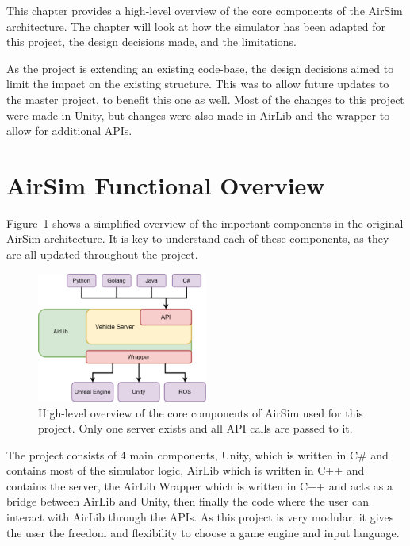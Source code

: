 This chapter provides a high-level overview of the core components of the AirSim architecture. The chapter will look at how the simulator has been adapted for this project, the design decisions made, and the limitations. 

As the project is extending an existing code-base, the design decisions aimed to limit the impact on the existing structure. This was to allow future updates to the master project, to benefit this one as well. Most of the changes to this project were made in Unity, but changes were also made in AirLib and the wrapper to allow for additional APIs. 

\section{AirSim Functional Overview} \label{05:Overview}
Figure~\ref{ADA:Figure:OriginalOverview} shows a simplified overview of the important components in the original AirSim architecture. It is key to understand each of these components, as they are all updated throughout the project. 

\begin{figure}[h]
    \centering
    \includegraphics[width=0.5\textwidth]{05_AnalysisAndDesign/Diagrams/OriginalOverview.png}
    \caption[High-level overview of AirSim]{High-level overview of the core components of AirSim used for this project. Only one server exists and all API calls are passed to it.}
    \label{ADA:Figure:OriginalOverview}
\end{figure}

The project consists of 4 main components, Unity, which is written in C\# and contains most of the simulator logic, AirLib which is written in C++ and contains the server, the AirLib Wrapper which is written in C++ and acts as a bridge between AirLib and Unity, then finally the code where the user can interact with AirLib through the APIs. As this project is very modular, it gives the user the freedom and flexibility to choose a game engine and input language. 

